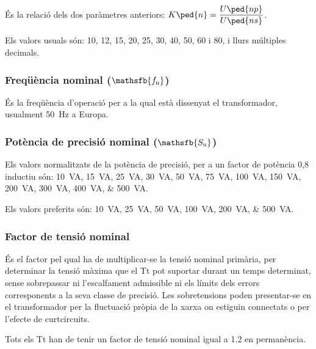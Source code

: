  És la relació  dels dos paràmetres anteriors: $K\ped{n} = \dfrac{U\ped{np}}{U\ped{ns}}$.

 Els valors usuals són: 10, 12, 15, 20, 25, 30, 40, 50, 60 i 80, i llurs múltiples decimals.

\subsubsection{Freqüència nominal ($\mathsfb{f_\text{n}}$)}

 És la freqüència d'operació per a la qual  està dissenyat el transformador, usualment \qty{50}{Hz} a Europa.

\subsubsection{Potència de precisió nominal ($\mathsfb{S_\text{n}}$)}

Els valors normalitzats de la potència de precisió, per
a un factor de potència 0,8 inductiu són: \qtylist{10; 15; 25; 30; 50; 75; 100; 150;
 200; 300; 400; 500}{VA}.

 Els valors preferits són: \qtylist{10; 25; 50; 100; 200; 500}{VA}.



\subsubsection{Factor de tensió nominal}

 És el factor pel qual ha de
multiplicar-se la tensió nominal primària, per  determinar la
tensió màxima que el Tt pot suportar durant un temps determinat,
sense sobrepassar ni l'escalfament admissible ni els límits dels errors
corresponents a la seva classe de precisió. Les sobretensions poden
presentar-se en el transformador  per la fluctuació
pròpia de la xarxa on estiguin connectats o per l'efecte de curtcircuits.

Tots els  Tt han de tenir un factor de tensió nominal igual a \num{1,2} en permanència.

